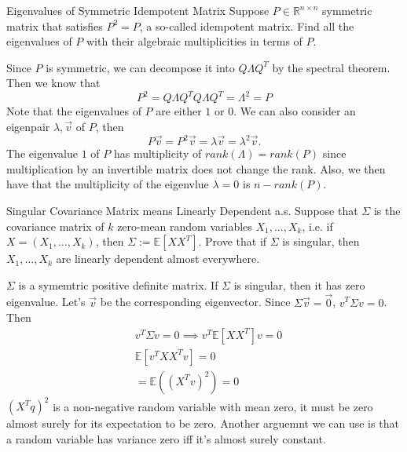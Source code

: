 \documentclass[../main]{subfiles}
\begin{document}
\begin{bbox}{Eigenvalues of Symmetric Idempotent Matrix}
    Suppose $P\in \mathbb R^{n\times n}$ symmetric matrix that satisfies $P^2 = P$, a so-called idempotent matrix. Find all the eigenvalues of $P$ with their algebraic multiplicities in terms of $P$.
\end{bbox}
\begin{solution}
    Since $P$ is symmetric, we can decompose it into $Q \Lambda Q^T$ by the spectral theorem. Then we know that 
    \[
    P^2 = Q\Lambda Q^T Q \Lambda Q^T = \Lambda^2 = P
    \]
    Note that the eigenvalues of $P$ are either $1$ or $0$.
    \newline
    We can also consider an eigenpair $\lambda, \vec v$ of $P$, then 
    \[
    P\vec v = P^2 \vec v = \lambda\vec v = \lambda^2 \vec v.
    \]
    The eigenvalue $1$ of $P$ has multiplicity of $rank (\Lambda) = rank(P)$ since multiplication by an invertible matrix does not change the rank. Also, we then have that the multiplicity of the eigenvlue $\lambda=0$ is $n-rank(P)$.
\end{solution}
\begin{bbox}{Singular Covariance Matrix means Linearly Dependent a.s.}
    Suppose that $\Sigma$ is the covariance matrix of $k$ zero-mean random variables $X_1,\dots, X_k$, i.e. if $X=(X_1, \dots, X_k)$, then $\Sigma:= \mathbb E[XX^T]$. Prove that if $\Sigma$ is singular, then $X_1,\dots, X_k$ are linearly dependent almost everywhere.
\end{bbox}
\begin{solution}
    $\Sigma$ is a symemtric positive definite matrix. If $\Sigma$ is singular, then it has zero eigenvalue. Let's $\vec v$ be the corresponding eigenvector. Since $\Sigma \vec v=\vec 0$, $v^T \Sigma v = 0$. Then
    \begin{align*}
    &v^T \Sigma v = 0\implies v^T \mathbb E[XX^T]v=0\\
    &\mathbb E[v^TXX^Tv] = 0\\
    &= \mathbb E ((X^T v)^2) = 0
    \end{align*}
    $(X^Tq)^2$ is a non-negative random variable with mean zero, it must be zero almost surely for its expectation to be zero.
    \newline
    Another arguemnt we can use is that a random variable has variance zero iff it's almost surely constant.
\end{solution}
\end{document}
